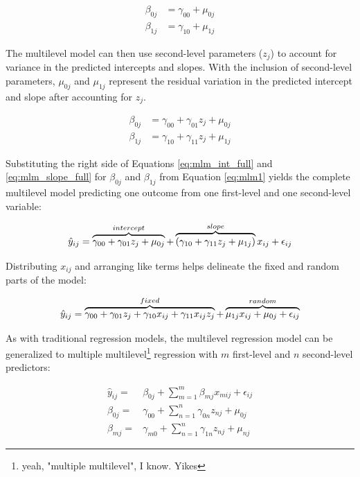 \documentclass[
]{article}
\begin{document}
\begin{align}
\beta_{0j}&=\gamma_{00}+\mu_{0j}\label{eq:mlm_int}\\
\beta_{1j}&=\gamma_{10}+\mu_{1j}\label{eq:mlm_slope}
\end{align}

\noindent
The multilevel model can then use second-level parameters (\(z_{j}\)) to account for variance in the predicted intercepts and slopes. With the inclusion of second-level parameters, \(\mu_{0j}\) and \(\mu_{1j}\) represent the residual variation in the predicted intercept and slope after accounting for \(z_{j}\).

\begin{align}
\beta_{0j}&=\gamma_{00}+\gamma_{01}z_{j}+\mu_{0j}\label{eq:mlm_int_full}\\
\beta_{1j}&=\gamma_{10}+\gamma_{11}z_{j}+\mu_{1j}\label{eq:mlm_slope_full}
\end{align}

\noindent
Substituting the right side of Equations \ref{eq:mlm_int_full} and \ref{eq:mlm_slope_full} for \(\beta_{0j}\) and \(\beta_{1j}\) from Equation \ref{eq:mlm1} yields the complete multilevel model predicting one outcome from one first-level and one second-level variable:

\begin{equation}
\hat{y}_{ij}=\overbrace{\textstyle \gamma_{00}+\gamma_{01}z_{j}+\mu_{0j}}^{\mathclap{intercept}}+
\overbrace{\textstyle (\gamma_{10}+\gamma_{11}z_{j}+\mu_{1j})}^{\mathclap{slope}}x_{ij}+\epsilon_{ij}
\label{eq:mlm2}
\end{equation}

\noindent
Distributing \(x_{ij}\) and arranging like terms helps delineate the fixed and random parts of the model:

\begin{equation}
\hat{y}_{ij}=\overbrace{\textstyle 
\gamma_{00}+\gamma_{01}z_{j}+\gamma_{10}x_{ij}+\gamma_{11}x_{ij}z_{j}}^{\mathclap{fixed}}+
\overbrace{\textstyle \mu_{1j}x_{ij}+\mu_{0j}+\epsilon_{ij}}^{\mathclap{random}}
\label{eq:mlm3}
\end{equation}

\noindent
As with traditional regression models, the multilevel regression model can be generalized to multiple multilevel\footnote{yeah, "multiple multilevel", I know. Yikes} regression with \(m\) first-level and \(n\) second-level predictors:

\begin{align}
\hat{y}_{ij}=&\beta_{0j}+\sum\limits_{m=1}^{m}\beta_{mj}x_{mij}+\epsilon_{ij}\\
\beta_{0j}=&\gamma_{00}+\sum\limits_{n=1}^{n}\gamma_{0n}z_{nj}+\mu_{0j}\\
\beta_{mj}=&\gamma_{m0}+\sum\limits_{n=1}^{n}\gamma_{1n}z_{nj}+\mu_{nj}
\label{eq:mlm4}
\end{align}
\end{document}
